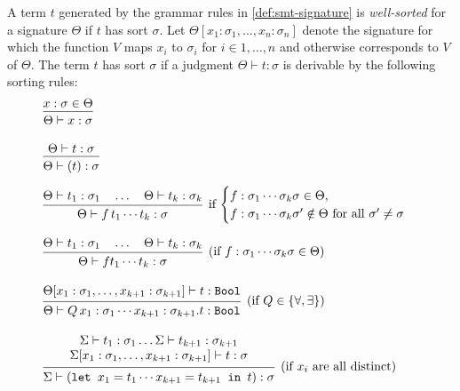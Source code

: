 \begin{definition}
A term $t$ generated by the grammar rules in \cref{def:smt-signature} is \emph{well-sorted} for a signature $\Theta$ if $t$ has sort $\sigma$.  
Let $\Theta[x_1 : \sigma_1, \dots, x_n : \sigma_n]$ denote the signature for which the function $V$ maps $x_i$ to $\sigma_i$ for $i \in 1,\dots,n$ and otherwise corresponds to $V$ of $\Theta$.  
The term $t$ has sort $\sigma$ if a judgment $\Theta \vdash t : \sigma$ is derivable by the following sorting rules:
\[
\begin{array}{l}
\begin{prooftree}
\hypo{x : \sigma \in \Theta}
\infer1{\Theta \vdash x : \sigma}
\end{prooftree}
\\[2em]
\begin{prooftree}
\hypo{\Theta \vdash t : \sigma}
\infer1{\Theta \vdash (t) : \sigma}
\end{prooftree}
\\[2em]
\begin{prooftree}
\hypo{\Theta \vdash t_1 : \sigma_1 \quad \dots \quad \Theta \vdash t_k : \sigma_k}
\infer1[if $\begin{cases} f : \sigma_1 \cdots \sigma_k \sigma \in \Theta, \\ f : \sigma_1 \cdots \sigma_k \sigma' \notin \Theta \text{ for all } \sigma' \neq \sigma \end{cases}$]{\Theta \vdash f\, t_1 \cdots t_k : \sigma}
\end{prooftree}
\\[2em]
\begin{prooftree}
\hypo{\Theta \vdash t_1 : \sigma_1 \quad \dots \quad \Theta \vdash t_k : \sigma_k}
\infer1[(if $f : \sigma_1 \cdots \sigma_k \sigma \in \Theta$)]{\Theta \vdash f t_1 \cdots t_k : \sigma}
\end{prooftree}
\\[2em]
\begin{prooftree}
\hypo{\Theta[x_1 : \sigma_1, \dots, x_{k+1} : \sigma_{k+1}] \vdash t : \kw{Bool}}
\infer1[(if $Q \in \{\forall, \exists\}$)]{\Theta \vdash Q\, x_1 : \sigma_1 \cdots x_{k+1} : \sigma_{k+1} . t : \kw{Bool}}
\end{prooftree}
\\[2em]
\begin{prooftree}
\hypo{
  \begin{matrix}
    \Sigma \vdash t_1 : \sigma_1 \dots  \Sigma \vdash t_{k+1} : \sigma_{k+1}  \\
    \Sigma[x_1 : \sigma_1, \dots, x_{k+1} : \sigma_{k+1}] \vdash t : \sigma
  \end{matrix}
}
\infer1[(if $x_i$ are all distinct)]{\Sigma \vdash (\kw{let } x_1 = t_1 \cdots x_{k+1} = t_{k+1} \kw{ in } t) : \sigma}
\end{prooftree}
\end{array}
\]
\end{definition}



